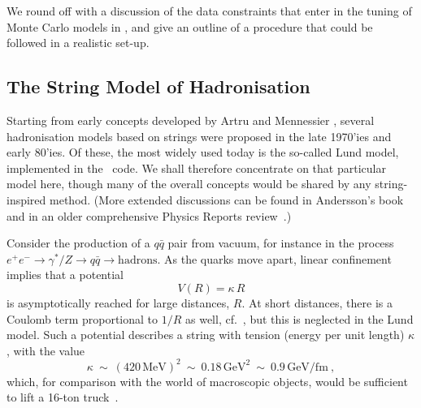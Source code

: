 We round off with a discussion of the data constraints that enter in
the tuning of Monte Carlo models in , and give an
outline of a procedure that could be followed in a realistic set-up.


\subsection{The String Model of Hadronisation\label{sec:stringModel}}
%
Starting from early concepts developed by Artru and Mennessier 
\cite{Artru:1974hr}, several hadronisation models based on strings
were proposed in the late 1970'ies and early 80'ies. 
Of these, the most widely used today is
the so-called Lund model, implemented in the \Py~code. 
%
We shall therefore concentrate on that particular model here, though
many of the overall concepts would be shared by any string-inspired
method. (More extended discussions can be found in Andersson's
book~\cite{Andersson:1998tv} and in an older comprehensive Physics Reports
review~\cite{Andersson:1983ia}.) 


%
Consider the production of a $q\bar{q}$ pair from vacuum, for instance
in the process $e^+e^-\to \gamma^*/Z\to q\bar{q} \to
\mbox{hadrons}$. As the quarks 
move apart, linear confinement implies that a potential 
%
\begin{equation}
V(R) = \kappa\, R \label{eq:string}
\end{equation}
is asymptotically reached for large distances, $R$. At short 
distances, there is a Coulomb term proportional to $1/R$ as well,
cf.~, but
this is neglected in the Lund model. Such a potential describes a 
string with tension (energy per unit length) $\kappa$, with the
value~\cite{Bali:1992ab} 
\begin{equation}
\kappa~\sim~(420\,\mbox{MeV})^2~\sim~0.18\,\mbox{GeV}^2~\sim~0.9\,\mbox{GeV/fm}~, 
\end{equation}
which, for comparison with the world of macroscopic objects, would be 
sufficient to lift a 16-ton truck~\cite{travis}. 

